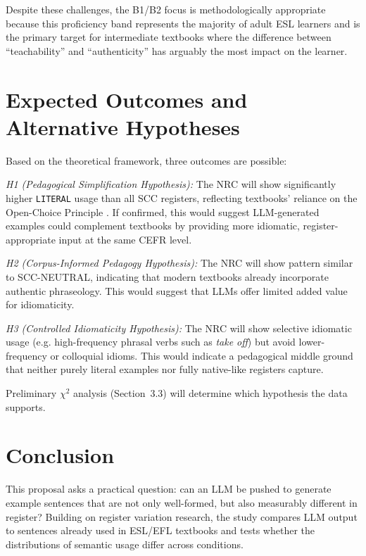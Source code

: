 Despite these challenges, the B1/B2 focus is methodologically appropriate because this proficiency band represents the majority of adult ESL learners and is the primary target for intermediate textbooks where the difference between ``teachability'' and ``authenticity'' has arguably the most impact on the learner.

\section{Expected Outcomes and Alternative Hypotheses}

Based on the theoretical framework, three outcomes are possible:

\textit{H1 (Pedagogical Simplification Hypothesis):} The NRC will show significantly higher \texttt{LITERAL} usage than all SCC registers, reflecting textbooks' reliance on the Open-Choice Principle \parencite{sinclairCorpusConcordanceCollocation1991}. If confirmed, this would suggest LLM-generated examples could complement textbooks by providing more idiomatic, register-appropriate input at the same CEFR level.

\textit{H2 (Corpus-Informed Pedagogy Hypothesis):} The NRC will show pattern similar to SCC-NEUTRAL, indicating that modern textbooks already incorporate authentic phraseology. This would suggest that LLMs offer limited added value for idiomaticity.

\textit{H3 (Controlled Idiomaticity Hypothesis):} The NRC will show selective idiomatic usage (e.g. high-frequency phrasal verbs such as \textit{take off}) but avoid lower-frequency or colloquial idioms. This would indicate a pedagogical middle ground that neither purely literal examples nor fully native-like registers capture.

Preliminary $\chi^2$ analysis (Section~3.3) will determine which hypothesis the data supports.

\section{Conclusion}
\label{sec:conclusion}

This proposal asks a practical question: can an LLM be pushed to generate example sentences that are not only well-formed, but also measurably different in register? Building on register variation research, the study compares LLM output to sentences already used in ESL/EFL textbooks and tests whether the distributions of semantic usage differ across conditions.


